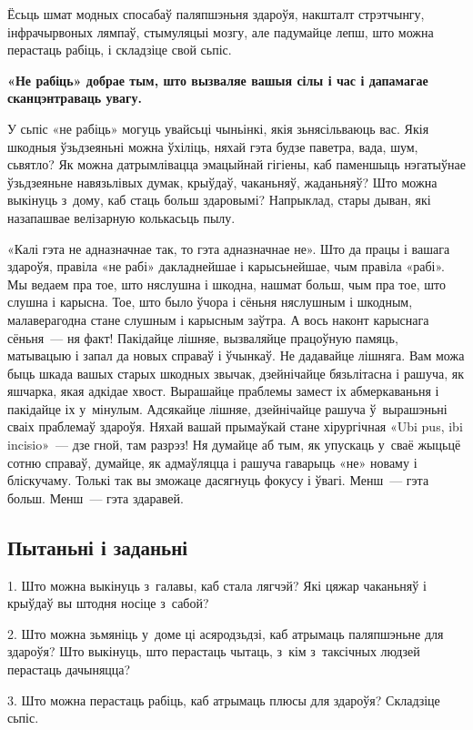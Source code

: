 Ёсьць шмат модных спосабаў паляпшэньня здароўя, накшталт стрэтчынгу, інфрачырвоных лямпаў, стымуляцыі мозгу, але падумайце лепш, што можна перастаць рабіць, і складзіце свой сьпіс.

\textbf{«Не рабіць» добрае тым, што вызваляе вашыя сілы і час і дапамагае сканцэнтраваць увагу.}

У сьпіс «не рабіць» могуць увайсьці чыньінкі, якія зьнясільваюць вас. Якія шкодныя ўзьдзеяньні можна ўхіліць, няхай гэта будзе паветра, вада, шум, сьвятло? Як можна датрымлівацца эмацыйнай гігіены, каб паменшыць нэгатыўнае ўзьдзеяньне навязьлівых думак, крыўдаў, чаканьняў, жаданьняў? Што можна выкінуць з~дому, каб стаць больш здаровымі? Напрыклад, стары дыван, які назапашвае велізарную колькасьць пылу.

«Калі гэта не адназначнае так, то гэта адназначнае не». Што да працы і вашага здароўя, правіла «не рабі» дакладнейшае і карысьнейшае, чым правіла «рабі». Мы ведаем пра тое, што няслушна і шкодна, нашмат больш, чым пра тое, што слушна і карысна. Тое, што было ўчора і сёньня няслушным і шкодным, малаверагодна стане слушным і карысным заўтра. А вось наконт карыснага сёньня~--- ня факт! Пакідайце лішняе, вызваляйце працоўную памяць, матывацыю і запал да новых справаў і ўчынкаў. Не дадавайце лішняга. Вам можа быць шкада вашых старых шкодных звычак, дзейнічайце бязьлітасна і рашуча, як яшчарка, якая адкідае хвост. Вырашайце праблемы замест іх абмеркаваньня і пакідайце іх у~мінулым. Адсякайце лішняе, дзейнічайце рашуча ў~вырашэньні сваіх праблемаў здароўя. Няхай вашай прымаўкай стане хірургічная «Ubi pus, ibi incisio»~--- дзе гной, там разрэз! Ня думайце аб тым, як упускаць у~сваё жыцьцё сотню справаў, думайце, як адмаўляцца і рашуча гаварыць «не» новаму і бліскучаму. Толькі так вы зможаце дасягнуць фокусу і ўвагі. Менш~--- гэта больш. Менш~--- гэта здаравей.

\subsection*{Пытаньні і заданьні}

1. Што можна выкінуць з~галавы, каб стала лягчэй? Які цяжар чаканьняў і крыўдаў вы штодня носіце з~сабой?

2. Што можна зьмяніць у~доме ці асяродзьдзі, каб атрымаць паляпшэньне для здароўя? Што выкінуць, што перастаць чытаць, з~кім з~таксічных людзей перастаць дачыняцца?

3. Што можна перастаць рабіць, каб атрымаць плюсы для здароўя? Складзіце сьпіс.


